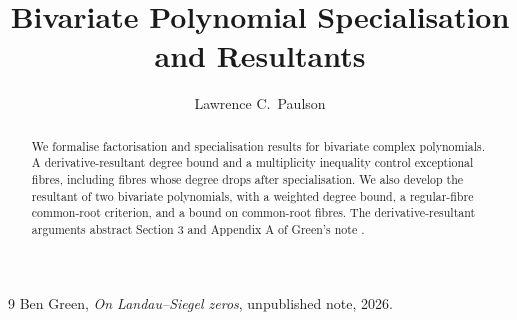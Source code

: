 \documentclass[11pt,a4paper]{article}
\begin{document}
\title{Bivariate Polynomial Specialisation and Resultants}
\author{Lawrence C.\ Paulson}
\maketitle

\begin{abstract}
We formalise factorisation and specialisation results for bivariate complex
polynomials. A derivative-resultant degree bound and a multiplicity inequality
control exceptional fibres, including fibres whose degree drops after
specialisation. We also develop the resultant of two bivariate polynomials,
with a weighted degree bound, a regular-fibre common-root criterion, and a
bound on common-root fibres. The derivative-resultant arguments abstract
Section 3 and Appendix A of Green's note \cite{green}.
\end{abstract}



\begin{thebibliography}{9}
Ben Green, \emph{On Landau--Siegel zeros}, unpublished note, 2026.
\end{thebibliography}
\end{document}
